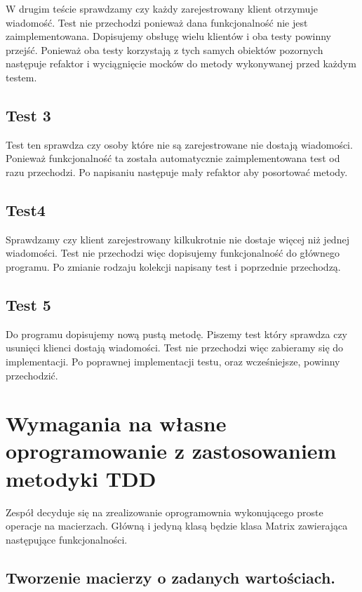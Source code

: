 \documentclass[a4paper,12pt,twoside]{article}
\begin{document}
W drugim teście sprawdzamy czy każdy zarejestrowany klient otrzymuje wiadomość.
Test nie przechodzi ponieważ dana funkcjonalność nie jest zaimplementowana.
Dopisujemy obsługę wielu klientów i oba testy powinny przejść.
Ponieważ oba testy korzystają z tych samych obiektów pozornych następuje refaktor i wyciągnięcie
mocków do metody wykonywanej przed każdym testem.

\subsection{Test 3}

Test ten sprawdza czy osoby które nie są zarejestrowane nie dostają wiadomości.
Ponieważ funkcjonalność ta została automatycznie zaimplementowana test od razu przechodzi.
Po napisaniu następuje mały refaktor aby posortować metody.

\subsection{Test4}

Sprawdzamy czy klient zarejestrowany kilkukrotnie nie dostaje więcej niż jednej wiadomości.
Test nie przechodzi więc dopisujemy funkcjonalność do głównego programu.
Po zmianie rodzaju kolekcji napisany test i poprzednie przechodzą.

\subsection{Test 5}
Do programu dopisujemy nową pustą metodę. Piszemy test który sprawdza czy usunięci klienci dostają wiadomości.
Test nie przechodzi więc zabieramy się do implementacji. Po poprawnej implementacji testu, oraz wcześniejsze, powinny przechodzić.

\section{Wymagania na własne oprogramowanie z zastosowaniem metodyki TDD}

Zespół decyduje się na zrealizowanie oprogramownia wykonującego proste operacje na macierzach.
Główną i jedyną klasą będzie klasa Matrix zawierająca następujące funkcjonalności.

\subsection{Tworzenie macierzy o zadanych wartościach.}
\end{document}
